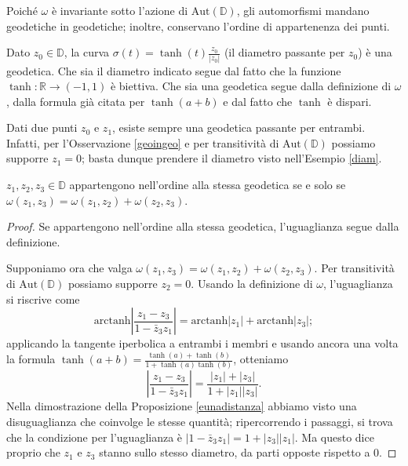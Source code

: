 \begin{oss} \label{geoingeo}
  Poiché $\omega$ è invariante sotto l'azione di $\text{Aut}(\mathbb{D})$, gli automorfismi mandano geodetiche in geodetiche; inoltre, conservano l'ordine di appartenenza dei punti.
\end{oss}

\begin{ex} \label{diam}
  Dato $z_0 \in \mathbb{D}$, la curva $\sigma(t)=\tanh(t)\frac{z_0}{|z_0|}$ (il diametro passante per $z_0$) è una geodetica. Che sia il diametro indicato segue dal fatto che la funzione $\tanh:\mathbb{R} \longrightarrow (-1,1)$ è biettiva. Che sia una geodetica segue dalla definizione di $\omega$, dalla formula già citata per $\tanh(a+b)$ e dal fatto che $\tanh$ è dispari.
\end{ex}

\begin{oss}
  Dati due punti $z_0$ e $z_1$, esiste sempre una geodetica passante per entrambi. Infatti, per l'Osservazione \ref{geoingeo} e per transitività di $\text{Aut}(\mathbb{D})$ possiamo supporre $z_1=0$; basta dunque prendere il diametro visto nell'Esempio \ref{diam}.
\end{oss}

\begin{lm} \label{nellordine}
  $z_1,z_2,z_3 \in \mathbb{D}$ appartengono nell'ordine alla stessa geodetica se e solo se $\omega(z_1,z_3)=\omega(z_1,z_2)+\omega(z_2,z_3)$.
\end{lm}

\begin{proof}
  Se appartengono nell'ordine alla stessa geodetica, l'uguaglianza segue dalla definizione.

  Supponiamo ora che valga $\omega(z_1,z_3)=\omega(z_1,z_2)+\omega(z_2,z_3)$. Per transitività di $\text{Aut}(\mathbb{D})$ possiamo supporre $z_2=0$. Usando la definizione di $\omega$, l'uguaglianza si riscrive come
  $$\text{arctanh}\left|\frac{z_1-z_3}{1-\bar{z}_3z_1}\right|=\text{arctanh}|z_1|+\text{arctanh}|z_3|;$$
  applicando la tangente iperbolica a entrambi i membri e usando ancora una volta la formula $\tanh(a+b)=\frac{\tanh(a)+\tanh(b)}{1+\tanh(a)\tanh(b)}$, otteniamo
  $$\left|\frac{z_1-z_3}{1-\bar{z}_3z_1}\right|=\frac{|z_1|+|z_3|}{1+|z_1||z_3|}.$$
  Nella dimostrazione della Proposizione \ref{eunadistanza} abbiamo visto una disuguaglianza che coinvolge le stesse quantità; ripercorrendo i passaggi, si trova che la condizione per l'uguaglianza è $|1-\bar{z}_3z_1|=1+|z_3||z_1|$. Ma questo dice proprio che $z_1$ e $z_3$ stanno sullo stesso diametro, da parti opposte rispetto a $0$.
\end{proof}
